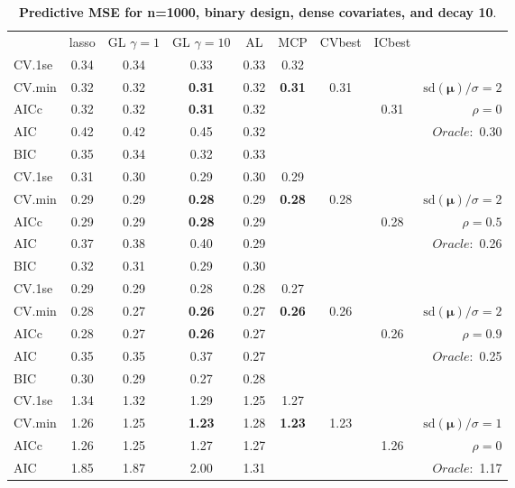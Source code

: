\begin{table}\vspace{-.5cm}
\caption[l]{ { \bf Predictive MSE for n=1000, binary design, 
dense covariates, and  decay  10}.}
\vspace{-.5cm}
\footnotesize{}
\begin{center}
\begin{tabular}{l*{7}{c}|r}
 & lasso & GL $\gamma=1$ & GL $\gamma=10$ & AL & MCP  & CVbest & ICbest  \\
\cline{1-9}
CV.1se & 0.34 & 0.34 & 0.33 & 0.33 & 0.32 & & & \\
CV.min & 0.32 & 0.32 & {\bf 0.31} & 0.32 & {\bf 0.31} & 0.31 & & $\mathrm{sd}(\mathbf{\mu})/\sigma=2$ \\
AICc & 0.32 & 0.32 & {\bf 0.31} & 0.32 & & & 0.31 &  $\rho=0$ \\
AIC & 0.42 & 0.42 & 0.45 & 0.32 & & & &  \multirow{2}{*}{$Oracle: $ 0.30} \\
BIC & 0.35 & 0.34 & 0.32 & 0.33 & & & &  \\
 \hline 
CV.1se & 0.31 & 0.30 & 0.29 & 0.30 & 0.29 & & & \\
CV.min & 0.29 & 0.29 & {\bf 0.28} & 0.29 & {\bf 0.28} & 0.28 & & $\mathrm{sd}(\mathbf{\mu})/\sigma=2$ \\
AICc & 0.29 & 0.29 & {\bf 0.28} & 0.29 & & & 0.28 &  $\rho=0.5$ \\
AIC & 0.37 & 0.38 & 0.40 & 0.29 & & & &  \multirow{2}{*}{$Oracle: $ 0.26} \\
BIC & 0.32 & 0.31 & 0.29 & 0.30 & & & &  \\
 \hline 
CV.1se & 0.29 & 0.29 & 0.28 & 0.28 & 0.27 & & & \\
CV.min & 0.28 & 0.27 & {\bf 0.26} & 0.27 & {\bf 0.26} & 0.26 & & $\mathrm{sd}(\mathbf{\mu})/\sigma=2$ \\
AICc & 0.28 & 0.27 & {\bf 0.26} & 0.27 & & & 0.26 &  $\rho=0.9$ \\
AIC & 0.35 & 0.35 & 0.37 & 0.27 & & & &  \multirow{2}{*}{$Oracle: $ 0.25} \\
BIC & 0.30 & 0.29 & 0.27 & 0.28 & & & &  \\
 \hline 
CV.1se & 1.34 & 1.32 & 1.29 & 1.25 & 1.27 & & & \\
CV.min & 1.26 & 1.25 & {\bf 1.23} & 1.28 & {\bf 1.23} & 1.23 & & $\mathrm{sd}(\mathbf{\mu})/\sigma=1$ \\
AICc & 1.26 & 1.25 & 1.27 & 1.27 & & & 1.26 &  $\rho=0$ \\
AIC & 1.85 & 1.87 & 2.00 & 1.31 & & & &  \multirow{2}{*}{$Oracle: $ 1.17} \\

\end{tabular}
\end{center}
\end{table}
